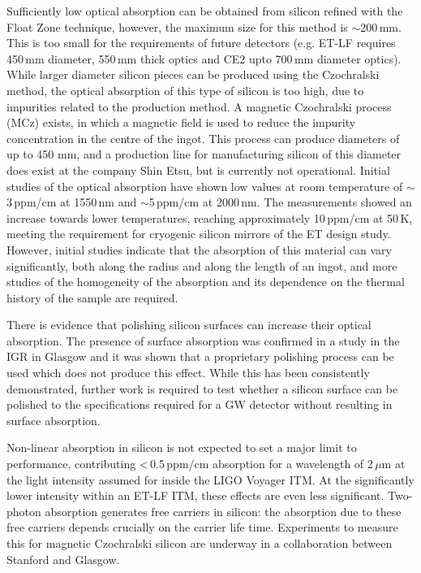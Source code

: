 Sufficiently low optical absorption can be obtained from silicon refined with the Float Zone technique, however, the maximum size for this method is $\sim$200\,mm. This is too small for the requirements of future detectors (e.g. ET-LF requires 450\,mm diameter, 550\,mm thick optics and CE2 upto 700\,mm diameter optics). While larger diameter silicon pieces can be produced using the Czochralski method, the optical absorption of this type of silicon is too high, due to impurities related to the production method. A magnetic Czochralski process (MCz) exists, in which a magnetic field is used to reduce the impurity concentration in the centre of the ingot. This process can produce diameters of up to 450 mm, and a production line for manufacturing silicon of this diameter does exist at the company Shin Etsu, but is currently not operational. Initial studies of the optical absorption have shown low values at room temperature of $\sim$3\,ppm/cm at 1550\,nm and $\sim$5\,ppm/cm at 2000\,nm. The measurements showed an increase towards lower temperatures, reaching approximately 10\,ppm/cm at 50\,K, meeting the requirement for cryogenic silicon mirrors of the ET design study. However, initial studies indicate that the absorption of this material can vary significantly, both along the radius and along the length of an ingot, and more studies of the homogeneity of the absorption and its dependence on the thermal history of the sample are required. 

There is evidence that polishing silicon surfaces can increase their optical absorption. The presence of surface absorption was confirmed in a study in the IGR in Glasgow \cite{SiliconSurfaceAbsorpBell2017} and it was shown that a proprietary polishing process can be used which does not produce this effect. While this has been consistently demonstrated, further work is required to test whether a silicon surface can be polished to the specifications required for a GW detector without resulting in surface absorption.

Non-linear absorption in silicon is not expected to set a major limit to performance, contributing <\,0.5\,ppm/cm absorption for a wavelength of 2\,$\mu$m at the light intensity assumed for inside the LIGO Voyager ITM. At the significantly lower intensity within an ET-LF ITM, these effects are even less significant. Two-photon absorption generates free carriers in silicon: the absorption due to these free carriers depends crucially on the carrier life time. Experiments to measure this for magnetic Czochralski silicon are underway in a collaboration between Stanford and Glasgow.

